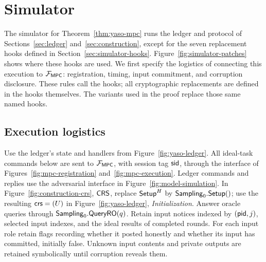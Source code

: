 \section{Simulator}
\label{sec:simulator-details}

The simulator for Theorem~\ref{thm:yaso-mpc} runs the ledger and protocol of Sections~\ref{sec:ledger}
and~\ref{sec:construction}, except for the seven replacement hooks defined
in Section~\ref{sec:simulator-hooks}.  Figure~\ref{fig:simulator-patches}
shows where these hooks are used.  We first specify the logistics of
connecting this execution to $\mathcal F_{\mathsf{MPC}}$: registration, timing, input
commitment, and corruption disclosure.  These rules call the hooks;
all cryptographic replacements are defined in the hooks themselves.
The variants used in the proof replace those same named hooks.



\subsection{Execution logistics}
\label{sec:simulator-logistics}

Use the ledger's state and handlers from Figure~\ref{fig:yaso-ledger}.
All ideal-task commands below are sent to $\mathcal F_{\mathsf{MPC}}$, with session tag
$\mathsf{sid}$, through the interface of Figures~\ref{fig:mpc-registration}
and~\ref{fig:mpc-execution}.  Ledger commands and replies use the
adversarial interface in Figure~\ref{fig:model-simulation}.
In Figure~\ref{fig:construction-crs}, $\mathsf{CRS}$, replace $\mathsf{Setup}^H$
by $\mathsf{Sampling}_0.\mathsf{Setup}()$; use the resulting $\mathsf{crs}=(U)$ in
Figure~\ref{fig:yaso-ledger}, \emph{Initialization}.  Answer oracle queries through
$\mathsf{Sampling}_0.\mathsf{QueryRO}(q)$.  Retain input notices indexed by $(\mathsf{pid},j)$,
selected input indexes, and the ideal results of completed rounds.
For each input role retain flags recording whether it posted honestly
and whether its input has committed, initially false.  Unknown input
contents and private outputs are retained symbolically until corruption
reveals them.

